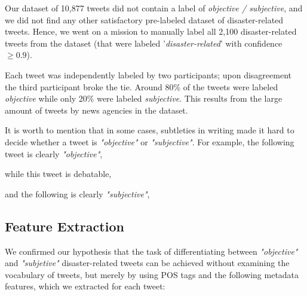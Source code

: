\documentclass[letterpaper,twocolumn,10pt]{article}
\begin{document}
Our dataset of 10,877 tweets did not contain a label of \textit{objective / subjective}, and we did not find any other satisfactory pre-labeled dataset of disaster-related tweets. Hence, we went on a mission to manually label all 2,100 disaster-related tweets from the dataset (that were labeled '\textit{disaster-related}' with confidence $ \ge 0.9 $).

Each tweet was independently labeled by two participants; upon disagreement the third participant broke the tie. Around 80\% of the tweets were labeled \textit{objective} while only 20\% were labeled \textit{subjective}. This results from the large amount of tweets by news agencies in the dataset.

It is worth to mention that in some cases, subtleties in writing made it hard to decide whether a tweet is \textit{"objective"} or \textit{"subjective"}. For example, the following tweet is clearly \textit{"objective"},

\begin{center}
	\parbox{190pt}{}
\end{center}

while this tweet is debatable,

\begin{center}
	\parbox{190pt}{}
\end{center}

and the following is clearly \textit{"subjective"},

\begin{center}
	\parbox{190pt}{}
\end{center}

\subsection{Feature Extraction}

We confirmed our hypothesis that the task of differentiating between \textit{"objective"} and \textit{"subjetive"} disaster-related tweets can be achieved without examining the vocabulary of tweets, but merely by using POS tags and the following metadata features, which we extracted for each tweet:
\end{document}
